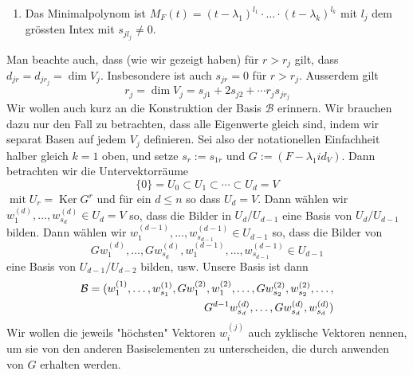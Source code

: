 {\begin{enumerate}[{(i)}]
            Dabei gilt $s_{jr} = 2d_{jr} - d_{j (r+1)} - d_{j (r-1)}$
        \item Das Minimalpolynom ist $M_F (t) = (t-\lambda_1)^{l_1} \cdot \dots \cdot (t-\lambda_k)^{l_k}$
            mit $l_j$ dem grössten Intex mit $s_{j l_j} \neq 0$.
    \end{enumerate}
    Man beachte auch, dass (wie wir gezeigt haben) für $r>r_{j}$ gilt, dass
    $d_{j r}=d_{j r_{j}}=\operatorname{dim} V_{j} .$ Insbesondere ist auch $s_{j r}=0$ für
    $r>r_{j} .$ Ausserdem gilt
    \[
    r_{j}=\operatorname{dim} V_{j}=s_{j 1}+2 s_{j 2}+\cdots r_{j} s_{j r_{j}}
    \]
    Wir wollen auch kurz an die Konstruktion der Basis $\mathcal{B}$ erinnern. Wir brauchen
    dazu nur den Fall zu betrachten, dass alle Eigenwerte gleich sind, indem wir separat Basen
    auf jedem $V_{j}$ definieren. Sei also der notationellen Einfachheit halber gleich $k=1$
    oben, und setze $s_{r}:=s_{1 r}$ und $G:=\left(F-\lambda_{1} i d_{V}\right) .$ Dann
    betrachten wir die Untervektorräume
    \[
    \{0\}=U_{0} \subset U_{1} \subset \cdots \subset U_{d}=V
    \]
    $\operatorname{mit} U_{r}=\operatorname{Ker} G^{r}$ und für ein $d \leq n$ so dass
    $U_{d}=V .$ Dann wählen wir $w_{1}^{(d)}, \ldots, w_{s_{d}}^{(d)} \in U_{d}=V$ so, dass
    die
    Bilder in $U_{d} / U_{d-1}$ eine Basis von $U_{d} / U_{d-1}$ bilden. Dann wählen wir
    $w_{1}^{(d-1)}, \ldots, w_{s_{d-1}}^{(d-1)} \in U_{d-1}$ so, dass die Bilder von
    \[
    G w_{1}^{(d)}, \ldots, G w_{s_{d}}^{(d)}, w_{1}^{(d-1)}, \ldots, w_{s_{d-1}}^{(d-1)} \in U_{d-1}
    \]
    eine Basis von $U_{d-1} / U_{d-2}$ bilden, usw. Unsere Basis ist dann
    \begin{align*}
        \mathcal{B} = ( w_1^{(1)} , \dots , w_{s_1}^{(1)} , G w_1^{(2)} , w_1^{(2)} , \dots , 
            G w_{s_2}^{(2)} , w_{s_2}^{(2)} , \dots , \\  G^{d-1} w_{s_d}^{(d)} , \dots ,
            G w_{s_d}^{(d)} , w_{s_d}^{(d)} )
    \end{align*}
    Wir wollen die jeweils "höchsten" Vektoren $w_{i}^{(j)}$ auch zyklische Vektoren nennen,
    um sie von den anderen Basiselementen zu unterscheiden, die durch anwenden von $G$
    erhalten werden.

}
